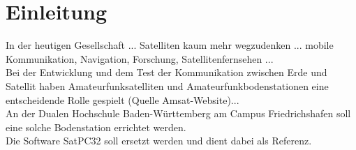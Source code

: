 
\chapter{Einleitung}

 In der heutigen Gesellschaft ... Satelliten kaum mehr wegzudenken ... mobile Kommunikation, Navigation, Forschung, Satellitenfernsehen ...\\
 Bei der Entwicklung und dem Test der Kommunikation zwischen Erde und Satellit haben Amateurfunksatelliten und Amateurfunkbodenstationen eine entscheidende Rolle gespielt (Quelle Amsat-Website)...\\
 An der Dualen Hochschule Baden-Württemberg am Campus Friedrichshafen soll eine solche Bodenstation errichtet werden.\\
 Die Software SatPC32 soll ersetzt werden und dient dabei als Referenz.

\clearpage
